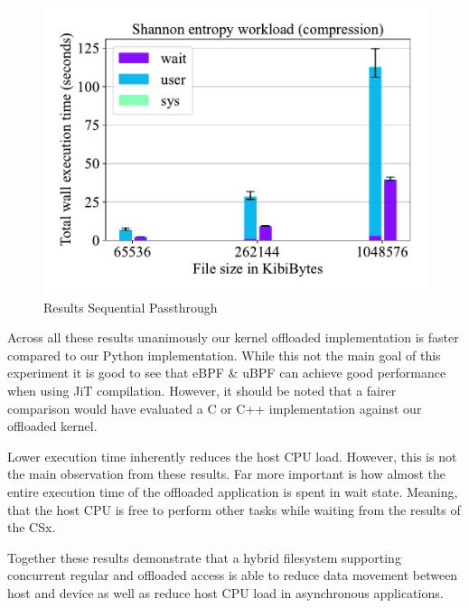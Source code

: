 \begin{figure}[h]
    \centering
	\includegraphics[width=1\textwidth]{resources/images/results-shannon-upper.pdf}
	\caption{Results Sequential Passthrough}
    \label{figure:shannonhigh}
\end{figure}

Across all these results unanimously our kernel offloaded implementation
is faster compared to our Python implementation. While this not the main goal of
this experiment it is good to see that eBPF \& uBPF can achieve good
performance when using JiT compilation. However, it should be noted that
a fairer comparison would have evaluated a C or C++ implementation against our
offloaded kernel.

Lower execution time inherently reduces the host CPU load. However, this is not
the main observation from these results. Far more important is how almost the
entire execution time of the offloaded application is spent in wait state.
Meaning, that the host CPU is free to perform other tasks while waiting from the
results of the CSx.

Together these results demonstrate that a hybrid filesystem supporting
concurrent regular and offloaded access is able to reduce data movement between
host and device as well as reduce host CPU load in asynchronous applications.


